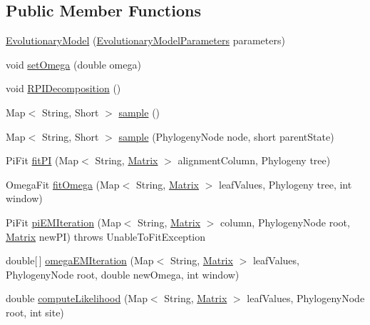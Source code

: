 \subsection*{Public Member Functions}
\begin{DoxyCompactItemize}
\item 
\hyperlink{classbroad_1_1core_1_1siphy_1_1_evolutionary_model_a996bd2f5c0af597d4aaddc6f3a3dfcbc}{Evolutionary\+Model} (\hyperlink{classbroad_1_1core_1_1siphy_1_1_evolutionary_model_parameters}{Evolutionary\+Model\+Parameters} parameters)
\item 
void \hyperlink{classbroad_1_1core_1_1siphy_1_1_evolutionary_model_a0a669885427f163c3382a5a7d77f2573}{set\+Omega} (double omega)
\item 
void \hyperlink{classbroad_1_1core_1_1siphy_1_1_evolutionary_model_a7e5a21c087bb673aff0ff56f310d6340}{R\+P\+I\+Decomposition} ()
\item 
Map$<$ String, Short $>$ \hyperlink{classbroad_1_1core_1_1siphy_1_1_evolutionary_model_acda3f10f0ee093adb4f690742c160a9b}{sample} ()
\item 
Map$<$ String, Short $>$ \hyperlink{classbroad_1_1core_1_1siphy_1_1_evolutionary_model_a26b4722f3613690bd8d65fd3302021a1}{sample} (Phylogeny\+Node node, short parent\+State)
\item 
Pi\+Fit \hyperlink{classbroad_1_1core_1_1siphy_1_1_evolutionary_model_a747977cc72f90040067d0bec01db876a}{fit\+P\+I} (Map$<$ String, \hyperlink{class_jama_1_1_matrix}{Matrix} $>$ alignment\+Column, Phylogeny tree)
\item 
Omega\+Fit \hyperlink{classbroad_1_1core_1_1siphy_1_1_evolutionary_model_ae734e28f8dfa928825ed4ef85e9afb62}{fit\+Omega} (Map$<$ String, \hyperlink{class_jama_1_1_matrix}{Matrix} $>$ leaf\+Values, Phylogeny tree, int window)
\item 
Pi\+Fit \hyperlink{classbroad_1_1core_1_1siphy_1_1_evolutionary_model_a415ddfdf47025334f3b77aa1090551d9}{pi\+E\+M\+Iteration} (Map$<$ String, \hyperlink{class_jama_1_1_matrix}{Matrix} $>$ column, Phylogeny\+Node root, \hyperlink{class_jama_1_1_matrix}{Matrix} new\+P\+I)  throws Unable\+To\+Fit\+Exception 
\item 
double\mbox{[}$\,$\mbox{]} \hyperlink{classbroad_1_1core_1_1siphy_1_1_evolutionary_model_ae96eafde7fdc8a56306db5c4a1f48fe4}{omega\+E\+M\+Iteration} (Map$<$ String, \hyperlink{class_jama_1_1_matrix}{Matrix} $>$ leaf\+Values, Phylogeny\+Node root, double new\+Omega, int window)
\item 
double \hyperlink{classbroad_1_1core_1_1siphy_1_1_evolutionary_model_af0505fba93f6d822b09fd631b78bfadf}{compute\+Likelihood} (Map$<$ String, \hyperlink{class_jama_1_1_matrix}{Matrix} $>$ leaf\+Values, Phylogeny\+Node root, int site)

\end{DoxyCompactItemize}

